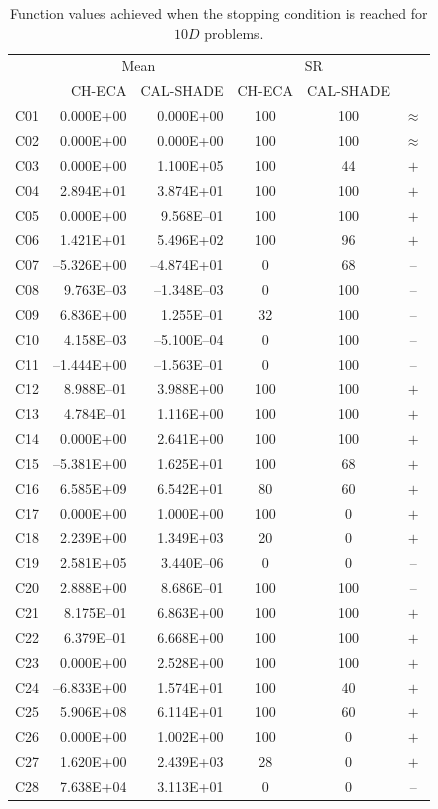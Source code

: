 \documentclass[conference]{IEEEtran}
\begin{document}
% 
% 
% 
\begin{table}[!ht]
	\caption{Function values achieved when the stopping condition is reached for $10D$ problems.}
	\centering
	\begin{tabular}{|c|r|r|c|c|c|}
	 \hline
	 &\multicolumn{2}{|c|}{Mean} & \multicolumn{2}{|c|}{SR} & \\
	\cline{2-5}
	    & CH-ECA & CAL-SHADE & CH-ECA & CAL-SHADE & \\ \hline
	C01 & 0.000E+00  & 0.000E+00  &  100 &  100 & $\approx$ \\ 
	C02 & 0.000E+00  & 0.000E+00  &  100 &  100 & $\approx$ \\ 
	C03 & 0.000E+00  & 1.100E+05  &  100 &   44 & $+$ \\ 
	C04 & 2.894E+01  & 3.874E+01  &  100 &  100 & $+$ \\ 
	C05 & 0.000E+00  & 9.568E--01  &  100 &  100 & $+$ \\ 
	C06 & 1.421E+01  & 5.496E+02  &  100 &   96 & $+$ \\ 
	C07 &--5.326E+00 &--4.874E+01 &    0 &   68 & -- \\ 
	C08 & 9.763E--03 &--1.348E--03 &    0 &  100 & -- \\ 
	C09 & 6.836E+00  & 1.255E--01  &   32 &  100 & -- \\ 
	C10 & 4.158E--03 &--5.100E--04 &    0 &  100 & -- \\ 
	C11 &--1.444E+00 &--1.563E--01 &    0 &  100 & -- \\ 
	C12 & 8.988E--01 & 3.988E+00  &  100 &  100 & $+$ \\ 
	C13 & 4.784E--01 & 1.116E+00  &  100 &  100 & $+$ \\ 
	C14 & 0.000E+00  & 2.641E+00  &  100 &  100 & $+$ \\ 
	C15 &--5.381E+00 & 1.625E+01  &  100 &   68 & $+$ \\ 
	C16 & 6.585E+09  & 6.542E+01  &   80 &   60 & $+$ \\ 
	C17 & 0.000E+00  & 1.000E+00  &  100 &    0 & $+$ \\ 
	C18 & 2.239E+00  & 1.349E+03  &   20 &    0 & $+$ \\ 
	C19 & 2.581E+05  & 3.440E--06  &    0 &    0 & -- \\ 
	C20 & 2.888E+00  & 8.686E--01  &  100 &  100 & -- \\ 
	C21 & 8.175E--01 & 6.863E+00  &  100 &  100 & $+$ \\ 
	C22 & 6.379E--01 & 6.668E+00  &  100 &  100 & $+$ \\ 
	C23 & 0.000E+00  & 2.528E+00  &  100 &  100 & $+$ \\ 
	C24 &--6.833E+00 & 1.574E+01  &  100 &   40 & $+$ \\ 
	C25 & 5.906E+08  & 6.114E+01  &  100 &   60 & $+$ \\ 
	C26 & 0.000E+00  & 1.002E+00  &  100 &    0 & $+$ \\ 
	C27 & 1.620E+00  & 2.439E+03  &   28 &    0 & $+$ \\ 
	C28 & 7.638E+04  & 3.113E+01  &    0 &    0 & -- \\ 
   \hline
	\end{tabular}
	\label{tab:d10c}
\end{table}
\end{document}
